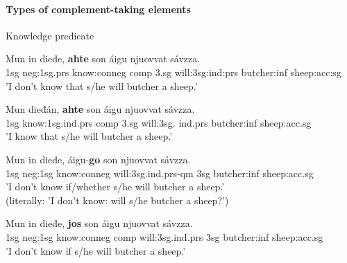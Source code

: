 \documentclass[a4,12pt]{scrartcl}
\begin{document}
\paragraph{Types of complement-taking elements}%
\begin{exe}
\ex	Knowledge predicate
	\begin{xlist}
	\ex 
	\gll Mun in dieđe, {\bf ahte} son áigu njuovvat sávzza.\\
	1{\sc sg} {\sc neg:1sg.prs} know:{\sc conneg} {\sc comp} {\sc 3.sg} will:{\sc 3sg:ind:prs} butcher:{\sc inf} sheep:{\sc acc:sg} \\
	\glt 'I don't know that s/he will butcher a sheep.'
	
	\ex 
	\gll Mun dieđán, {\bf ahte} son áigu njuovvat sávzza.\\
	1{\sc sg} know:{\sc 1sg.ind.prs} {\sc comp} {\sc 3.sg} will:{\sc 3sg. ind.prs} butcher:{\sc inf} sheep:{\sc acc.sg} \\
	\glt 'I know that s/he will butcher a sheep.' 

	\ex
	\gll Mun in dieđe, áigu-{\bf go} son njuovvat sávzza.\\
	{\sc 1sg} {\sc neg:1sg} know:{\sc conneg} will:{\sc 3sg.ind.prs}-{\sc qm} 3{\sc sg} butcher:{\sc inf} sheep:{\sc acc.sg}\\
	\glt 'I don't know if/whether s/he will butcher a sheep.'\\
	(literally: 'I don't know: will s/he butcher a sheep?')
	
	\ex 
	\gll Mun in dieđe, {\bf jos} son áigu njuovvat sávzza.\\
	{\sc 1sg} {\sc neg:1sg} know:{\sc conneg} {\sc comp} will:{3sg.ind.prs} 3{\sc sg} butcher:{\sc inf} sheep:{\sc acc.sg}\\
	\glt 'I don't know if s/he will butcher a sheep.'
	\end{xlist}
\end{exe}
\end{document}
